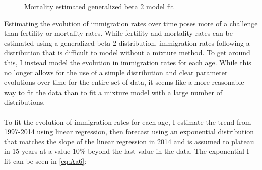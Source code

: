 \documentclass{article}
\renewcommand{\thesubsubsection}{\roman{subsubsection}}
\numberwithin{equation}{subsection}
\renewcommand{\subsubsection}[2][]{\oldsubsubsection[#1]{#2}\index{#1}\label{sec:\thesubsubsection}}
\newcommand*{\FigureDir}{../../graphs}
\begin{document}
\begin{appendices}
\begin{figure}[H]
   \centering
   \caption{\label{fig:\thesubsubsection4}Mortality estimated generalized beta 2 model fit}
\end{figure}


\subsubsection{Immigration}

Estimating the evolution of immigration rates over time poses more of a challenge than fertility or mortality rates. While fertility and mortality rates can be estimated using a generalized beta 2 distribution, immigration rates following a distribution that is difficult to model without a mixture method. To get around this, I instead model the evolution in immigration rates for each age. While this no longer allows for the use of a simple distribution and clear parameter evolutions over time for the entire set of data, it seems like a more reasonable way to fit the data than to fit a mixture model with a large number of distributions.
\\\\
To fit the evolution of immigration rates for each age, I estimate the trend from 1997-2014 using linear regression, then forecast using an exponential distribution that matches the slope of the linear regression in 2014 and is assumed to plateau in 15 years at a value 10\% beyond the last value in the data. The exponential I fit can be seen in \ref{eq:Aa6}:


\end{appendices}
\end{document}
